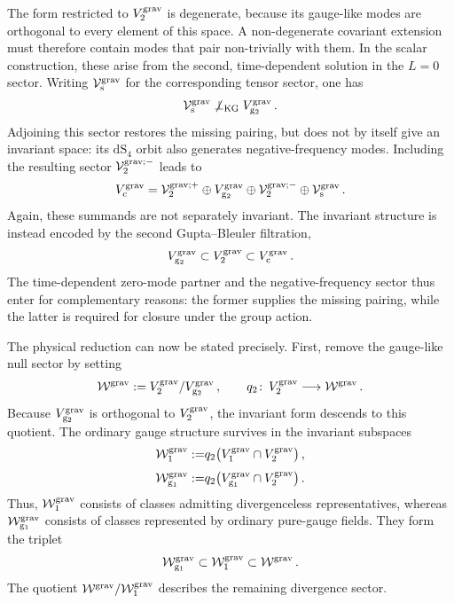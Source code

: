 \documentclass{SciPost}
\begin{document}
The form restricted to $V_2^{\rm grav}$ is degenerate, because its gauge-like modes are orthogonal to every element of this space. A non-degenerate covariant extension must therefore contain modes that pair non-trivially with them. In the scalar construction, these arise from the second, time-dependent solution in the $L=0$ sector. Writing ${\cal V}_{\rm s}^{\rm grav}$ for the corresponding tensor sector, one has
\begin{align}
    {\cal V}_{\rm s}^{\rm grav}
    \not\perp_{\rm KG}
    V_{{\rm g}_2}^{\rm grav} \,.
\end{align}
Adjoining this sector restores the missing pairing, but does not by itself give an invariant space: its $\mathrm{dS}_{4}$ orbit also generates negative-frequency modes. Including the resulting sector ${\cal V}_2^{\rm grav;-}$ leads to
\begin{align}
    V_{\rm c}^{\rm grav}
    =
    {\cal V}_2^{\rm grav;+}
    \oplus V_{{\rm g}_2}^{\rm grav}
    \oplus{\cal V}_2^{\rm grav;-}
    \oplus{\cal V}_{\rm s}^{\rm grav} \,.
\end{align}
Again, these summands are not separately invariant. The invariant structure is instead encoded by the second Gupta--Bleuler filtration,
\begin{align}\label{eq:graviton-GB2}
    V_{{\rm g}_2}^{\rm grav}
    \subset V_2^{\rm grav}
    \subset V_{\rm c}^{\rm grav} \,.
\end{align}
The time-dependent zero-mode partner and the negative-frequency sector thus enter for complementary reasons: the former supplies the missing pairing, while the latter is required for closure under the group action.

The physical reduction can now be stated precisely. First, remove the gauge-like null sector by setting
\begin{align}
    {\cal W}^{\rm grav}
    :=
    V_2^{\rm grav}/V_{{\rm g}_2}^{\rm grav} \,,
    \qquad
    q_2 \colon\,
    V_2^{\rm grav}\longrightarrow{\cal W}^{\rm grav} \,.
\end{align}
Because $V_{{\rm g}_2}^{\rm grav}$ is orthogonal to $V_2^{\rm grav}$, the invariant form descends to this quotient. The ordinary gauge structure survives in the invariant subspaces
\begin{align}
    {\cal W}_1^{\rm grav}
    :=&
    q_2\bigl(V_1^{\rm grav}\cap V_2^{\rm grav}\bigr) \,,
     \\[3pt]
    {\cal W}_{{\rm g}_1}^{\rm grav}
    :=&
    q_2\bigl(
        V_{{\rm g}_1}^{\rm grav}\cap V_2^{\rm grav}
    \bigr) \,.
\end{align}
Thus, ${\cal W}_1^{\rm grav}$ consists of classes admitting divergenceless representatives, whereas ${\cal W}_{{\rm g}_1}^{\rm grav}$ consists of classes represented by ordinary pure-gauge fields. They form the triplet
\begin{align}
    {\cal W}_{{\rm g}_1}^{\rm grav}
    \subset{\cal W}_1^{\rm grav}
    \subset{\cal W}^{\rm grav} \,.
\end{align}
The quotient ${\cal W}^{\rm grav}/{\cal W}_1^{\rm grav}$ describes the remaining divergence sector.
\end{document}
